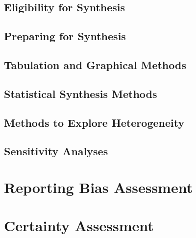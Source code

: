     \subsection{Eligibility for Synthesis}


    \subsection{Preparing for Synthesis}


    \subsection{Tabulation and Graphical Methods}


    \subsection{Statistical Synthesis Methods}


    \subsection{Methods to Explore Heterogeneity}


    \subsection{Sensitivity Analyses}

\section{Reporting Bias Assessment}


\section{Certainty Assessment}